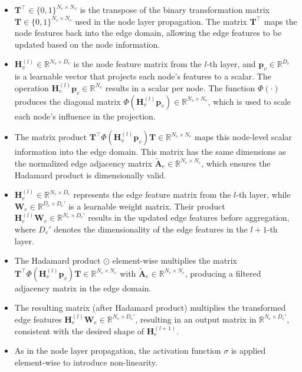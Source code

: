 \begin{itemize}
    \item \textbf{\( \mathbf{T}^\top \in \{0,1\}^{N_e \times N_v} \)} is the transpose of the binary transformation matrix \( \mathbf{T} \in \{0,1\}^{N_v \times N_e} \) used in the node layer propagation. The matrix \( \mathbf{T}^\top \) maps the node features back into the edge domain, allowing the edge features to be updated based on the node information.
    
    \item \( \mathbf{H}^{(l)}_v \in \mathbb{R}^{N_v \times D_v} \) is the node feature matrix from the \( l \)-th layer, and \( \mathbf{p}_v \in \mathbb{R}^{D_v} \) is a learnable vector that projects each node's features to a scalar. The operation \( \mathbf{H}^{(l)}_v \mathbf{p}_v \in \mathbb{R}^{N_v} \) results in a scalar per node. The function \( \Phi(\cdot) \) produces the diagonal matrix \( \Phi\left(\mathbf{H}^{(l)}_v \mathbf{p}_v\right) \in \mathbb{R}^{N_v \times N_v} \), which is used to scale each node's influence in the projection.
    
    \item The matrix product \( \mathbf{T}^\top \Phi\left(\mathbf{H}^{(l)}_v \mathbf{p}_v\right) \mathbf{T} \in \mathbb{R}^{N_e \times N_e} \) maps this node-level scalar information into the edge domain. This matrix has the same dimensions as the normalized edge adjacency matrix \( \tilde{\mathbf{A}}_e \in \mathbb{R}^{N_e \times N_e} \), which ensures the Hadamard product is dimensionally valid.
    
    \item \( \mathbf{H}^{(l)}_e \in \mathbb{R}^{N_e \times D_e} \) represents the edge feature matrix from the \( l \)-th layer, while \( \mathbf{W}_e \in \mathbb{R}^{D_e \times D_e'} \) is a learnable weight matrix. Their product \( \mathbf{H}^{(l)}_e \mathbf{W}_e \in \mathbb{R}^{N_e \times D_e'} \) results in the updated edge features before aggregation, where \( D_e' \) denotes the dimensionality of the edge features in the \( l+1 \)-th layer.
    
    \item The Hadamard product \( \odot \) element-wise multiplies the matrix \( \mathbf{T}^\top \Phi\left(\mathbf{H}^{(l)}_v \mathbf{p}_v\right) \mathbf{T} \in \mathbb{R}^{N_e \times N_e} \) with \( \tilde{\mathbf{A}}_e \in \mathbb{R}^{N_e \times N_e} \), producing a filtered adjacency matrix in the edge domain.
    
    \item The resulting matrix (after Hadamard product) multiplies the transformed edge features \( \mathbf{H}^{(l)}_e \mathbf{W}_e \in \mathbb{R}^{N_e \times D_e'} \), resulting in an output matrix in \( \mathbb{R}^{N_e \times D_e'} \), consistent with the desired shape of \( \mathbf{H}^{(l+1)}_e \).
    
    \item As in the node layer propagation, the activation function \( \sigma \) is applied element-wise to introduce non-linearity.
\end{itemize}

